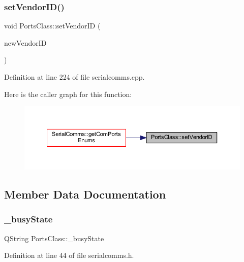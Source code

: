 \subsubsection{\texorpdfstring{setVendorID()}{setVendorID()}}
{\footnotesize\ttfamily void Ports\+Class\+::set\+Vendor\+ID (\begin{DoxyParamCaption}\item[{Q\+String}]{new\+Vendor\+ID }\end{DoxyParamCaption})}



Definition at line 224 of file serialcomms.\+cpp.

Here is the caller graph for this function\+:
\nopagebreak
\begin{figure}[H]
\begin{center}
\leavevmode
\includegraphics[width=350pt]{class_ports_class_af42f48bd88679919b34f19f0f05673c1_icgraph}
\end{center}
\end{figure}


\subsection{Member Data Documentation}
\mbox{\label{class_ports_class_a2b0fb1fe4e32ba5f05a3fe29433b2734}} 
\subsubsection{\texorpdfstring{\_busyState}{\_busyState}}
{\footnotesize\ttfamily Q\+String Ports\+Class\+::\+\_\+busy\+State\hspace{0.3cm}{\ttfamily [private]}}



Definition at line 44 of file serialcomms.\+h.

\mbox{\label{class_ports_class_abb945feb83936d92f49d2d83c9ffe9c7}} 

